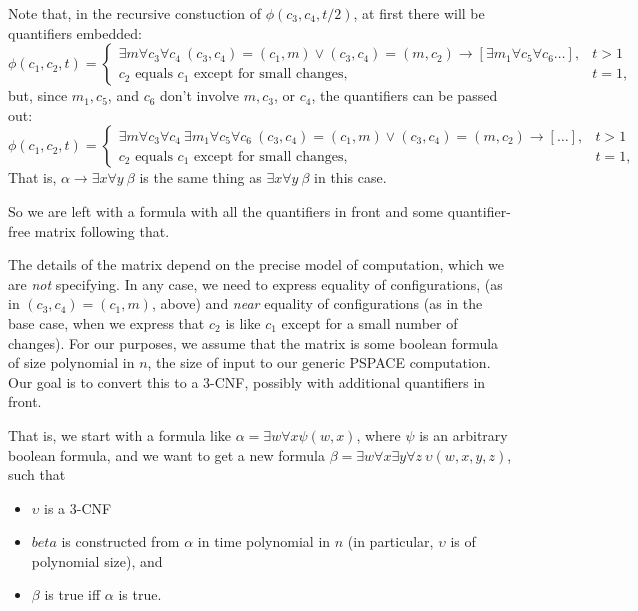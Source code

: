 \documentclass[2pt]{scrartcl}
\begin{document}
\begin{multicols}{6}
Note that, in the recursive constuction of $\phi(c_3,c_4,t/2)$, at
first there will be quantifiers embedded:
\[\phi(c_1,c_2,t)=
\left\{
\begin{array}{ll}
\exists m\forall c_3\forall c_4\>
(c_3,c_4)=(c_1,m)\lor(c_3,c_4)=(m,c_2)\to\left[\exists m_1\forall
  c_5\forall c_6\ldots\right], & t > 1\\
\mbox{$c_2$ equals $c_1$ except for small changes}, & t = 1,
\end{array}
\right.
\]
but, since $m_1,c_5$, and $c_6$ don't involve $m,c_3$, or $c_4$, the
quantifiers can be passed out:
\[\phi(c_1,c_2,t)=
\left\{
\begin{array}{ll}
\exists m\forall c_3\forall c_4\>\exists m_1\forall
  c_5\forall c_6\>
(c_3,c_4)=(c_1,m)\lor(c_3,c_4)=(m,c_2)\to\left[\ldots\right], & t > 1\\
\mbox{$c_2$ equals $c_1$ except for small changes}, & t = 1,
\end{array}
\right.
\]
That is, $\alpha\to\exists x\forall y\> \beta$ is the same thing as
$\exists x\forall y\>\beta$ in this case.

So we are left with a formula with all the quantifiers in front and
some quantifier-free matrix following that.

The details of the matrix depend on the precise model of computation,
which we are {\em not} specifying.  In any case, we need to express
equality of configurations, (as in $(c_3,c_4)=(c_1,m)$, above) and
{\em near} equality of configurations (as in the base case, when we
express that $c_2$ is like $c_1$ except for a small number of
changes).  For our purposes, we assume that the matrix is some boolean
formula of size polynomial in $n$, the size of input to our generic
PSPACE computation.  Our goal is to convert this to a 3-CNF, possibly
with additional quantifiers in front.

That is, we start with a formula like $\alpha=\exists w\forall x \psi(w,x)$,
where $\psi$ is an arbitrary boolean formula, and we want to get a new
formula $\beta=\exists w\forall x\exists y\forall
z\>\upsilon(w,x,y,z)$, such that
\begin{itemize}
\item $\upsilon$ is a 3-CNF
\item $beta$ is constructed from $\alpha$ in time polynomial in $n$
  (in particular, $\upsilon$ is of polynomial size), and
\item $\beta$ is true iff $\alpha$ is true.
\end{itemize}


\end{multicols}
\end{document}
